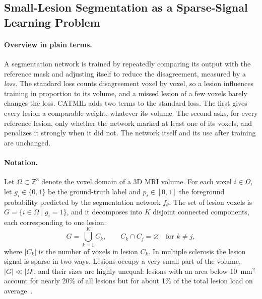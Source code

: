 \subsection{Small-Lesion Segmentation as a Sparse-Signal Learning Problem}
\label{sec:problem}

\paragraph{Overview in plain terms.}
A segmentation network is trained by repeatedly comparing its output with
the reference mask and adjusting itself to reduce the disagreement, measured
by a \emph{loss}. The standard loss counts disagreement voxel by voxel, so a
lesion influences training in proportion to its volume, and a missed lesion
of a few voxels barely changes the loss. CATMIL adds two terms to the
standard loss. The first gives every lesion a comparable weight, whatever
its volume. The second asks, for every reference lesion, only whether the
network marked at least one of its voxels, and penalizes it strongly when
it did not. The network itself and its use after training are unchanged.

\paragraph{Notation.}
Let $\Omega \subset \mathbb{Z}^{3}$ denote the voxel domain of a 3D MRI
volume. For each voxel $i \in \Omega$, let $g_i \in \{0,1\}$ be the
ground-truth label and $p_i \in [0,1]$ the foreground probability predicted
by the segmentation network $f_{\theta}$. The set of lesion voxels is
$G = \{ i \in \Omega \mid g_i = 1 \}$, and it decomposes into $K$ disjoint
connected components, each corresponding to one lesion:
\begin{equation}
G = \bigcup_{k=1}^{K} C_k,
\qquad
C_k \cap C_j = \varnothing \quad \text{for } k \neq j ,
\end{equation}
where $|C_k|$ is the number of voxels in lesion $C_k$. In multiple
sclerosis the lesion signal is sparse in two ways. Lesions occupy a very
small part of the volume, $|G| \ll |\Omega|$, and their sizes are highly
unequal: lesions with an area below 10~mm$^2$ account for nearly 20\% of
all lesions but for about 1\% of the total lesion load on
average~\cite{wang_survey_1997}.

